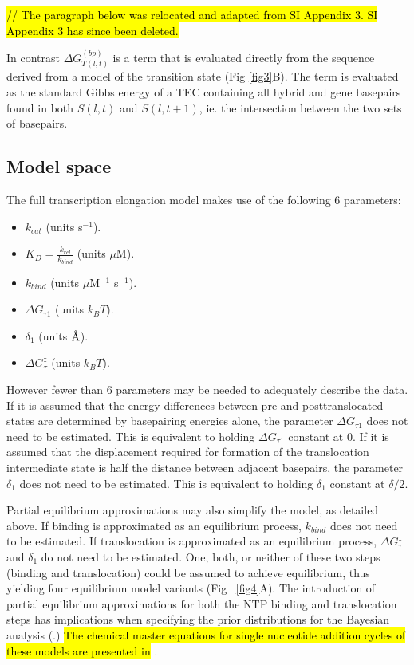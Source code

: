 \documentclass[10pt,letterpaper]{article}
\newcommand{\angstrom}{\mbox{\normalfont\AA}}
\begin{document}
\hl{// The paragraph below was relocated and adapted from SI Appendix 3. SI Appendix 3 has since been deleted.}


In contrast $\Delta G_{T(l,t)}^{(bp)}$ is a term that is evaluated directly from the sequence derived from a model of the transition state (Fig \ref{fig3}B). The term is evaluated as the standard Gibbs energy of a TEC containing all hybrid and gene basepairs found in both $S(l,t)$ and $S(l,t+1)$, ie. the intersection between the two sets of basepairs.








\subsection*{Model space}

The full transcription elongation model makes use of the following 6 parameters:

\begin{itemize}
\item $k_{cat}$ (units s$^{-1}$).
\item $K_D = \frac{k_{rel}}{k_{bind}}$ (units $\mu$M).
\item $k_{bind}$ (units $\mu$M$^{-1}$ s$^{-1}$).
\item $\Delta G_{\tau 1}$ (units $k_BT$).
\item $\delta_1$ (units $\angstrom$).
\item $\Delta G^\ddag_{\tau}$ (units $k_BT$).
\end{itemize}


However fewer than 6 parameters may be needed to adequately describe the data. If it is assumed that the energy differences between pre and posttranslocated states are determined by basepairing energies alone, the parameter $\Delta G_{\tau 1}$ does not need to be estimated. This is equivalent to holding $\Delta G_{\tau 1}$ constant at 0. If it is assumed that the displacement required for formation of the translocation intermediate state is half the distance between adjacent basepairs, the parameter $\delta_1$ does not need to be estimated. This is equivalent to holding $\delta_1$ constant at $\delta/2$.

Partial equilibrium approximations may also simplify the model, as detailed above. If binding is approximated as an equilibrium process, $k_{bind}$ does not need to be estimated. If translocation is approximated as an equilibrium process,  $\Delta G^\ddag_{\tau}$ and $\delta_1$ do not need to be estimated. One, both, or neither of these two steps (binding and translocation) could be assumed to achieve equilibrium, thus yielding four equilibrium model variants (Fig ~\ref{fig4}A). The introduction of partial equilibrium approximations for both the NTP binding and translocation steps has implications when specifying the prior distributions for the Bayesian analysis (.)
 \hl{The chemical master equations for single nucleotide addition cycles of these models are presented in} . \\
\end{document}
